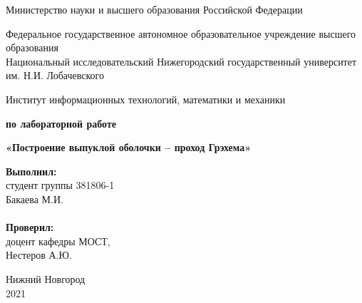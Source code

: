 \documentclass{report}
\begin{document}
\begin{titlepage}

\begin{center}
Министерство науки и высшего образования Российской Федерации
\end{center}

\begin{center}
Федеральное государственное автономное образовательное учреждение высшего образования \\
Национальный исследовательский Нижегородский государственный университет им. Н.И. Лобачевского
\end{center}

\begin{center}
Институт информационных технологий, математики и механики
\end{center}

\vspace{4em}

\begin{center}
\textbf{ по лабораторной работе} \\
\end{center}
\begin{center}
\textbf{\Large«Построение выпуклой оболочки – проход Грэхема»} \\
\end{center}

\vspace{4em}

\newbox{\lbox}
\newlength{\maxl}
\setlength{\maxl}{\wd\lbox}
\hfill\parbox{7cm}{
\hspace*{5cm}\hspace*{-5cm}\textbf{Выполнил:} \\ студент группы 381806-1 \\ Бакаева М.И.\\
\\
\hspace*{5cm}\hspace*{-5cm}\textbf{Проверил:}\\ доцент кафедры МОСТ, \\ Нестеров А.Ю.\\
}
\vspace{\fill}

\begin{center} Нижний Новгород \\ 2021 \end{center}

\end{titlepage}
\end{document}
